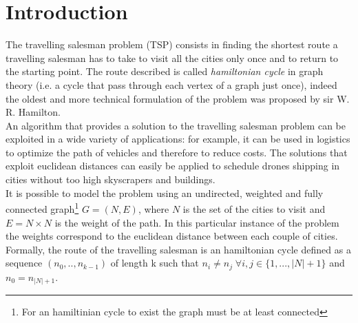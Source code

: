 \documentclass{article}
\begin{document}
\section{Introduction}
The travelling salesman problem (TSP) consists in finding the shortest route a travelling salesman has to take to visit all the cities only once and to return to the starting point. The route described is called \textit{hamiltonian cycle} in graph theory (i.e. a cycle that pass through each vertex of a graph just once), indeed the oldest and more technical formulation of the problem was proposed by sir W. R. Hamilton. \\
An algorithm that provides a solution to the travelling salesman problem can be exploited in a wide variety of applications: for example, it can be used in logistics to optimize the path of vehicles and therefore to reduce costs. The solutions that exploit euclidean distances can easily be applied to schedule drones shipping in cities without too high skyscrapers and buildings. \\
It is possible to model the problem using an undirected, weighted and fully connected graph\footnote{For an hamiltinian cycle to exist the graph must be at least connected} $G = (N,E)$, where $N$ is the set of the cities to visit and $E =  N \times N$ is the weight of the path. In this particular instance of the problem the weights correspond to the euclidean distance between each couple of cities.
Formally, the route of the travelling salesman is an hamiltonian cycle defined as a sequence $(n_0, .., n_{k-1})$ of length k such that $n_i \neq n_j \; \forall i,j \in \{1,..., |N|+1\}$ and $n_0 = n_{|N|+1}$. \\
\end{document}
